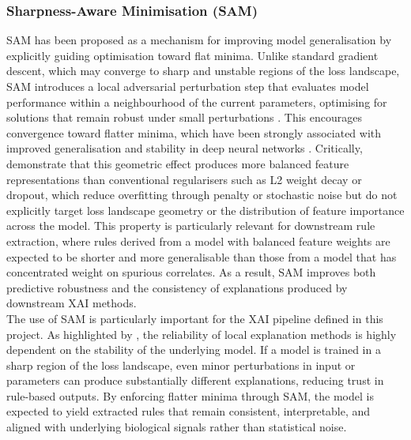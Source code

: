 \subsubsection{ Sharpness-Aware Minimisation (SAM)}
SAM has been proposed as a mechanism for improving model generalisation by explicitly guiding 
optimisation toward flat minima. Unlike standard gradient descent, which may converge to sharp 
and unstable regions of the loss landscape, SAM introduces a local adversarial perturbation 
step that evaluates model performance within a neighbourhood of the current parameters, 
optimising for solutions that remain robust under small perturbations \cite{Foret2021}. 
This encourages convergence toward flatter minima, which have been strongly associated with 
improved generalisation and stability in deep neural networks \cite{Li2018,Keskar2016}. 
Critically, \cite{Springer2024} demonstrate that this geometric effect produces more 
balanced feature representations than conventional regularisers such as L2 weight decay or 
dropout, which reduce overfitting through penalty or stochastic noise but do not explicitly 
target loss landscape geometry or the distribution of feature importance across the model. 
This property is particularly relevant for downstream rule extraction, where rules derived 
from a model with balanced feature weights are expected to be shorter and more generalisable 
than those from a model that has concentrated weight on spurious correlates. As a result, 
SAM improves both predictive robustness and the consistency of explanations produced by 
downstream XAI methods.
\\
The use of SAM is particularly important for the XAI pipeline defined in this project. As 
highlighted by \cite{Guidotti2021}, the reliability of local explanation methods is 
highly dependent on the stability of the underlying model. If a model is trained in a sharp 
region of the loss landscape, even minor perturbations in input or parameters can produce 
substantially different explanations, reducing trust in rule-based outputs. By enforcing 
flatter minima through SAM, the model is expected to yield extracted rules that remain 
consistent, interpretable, and aligned with underlying biological signals rather than 
statistical noise.

